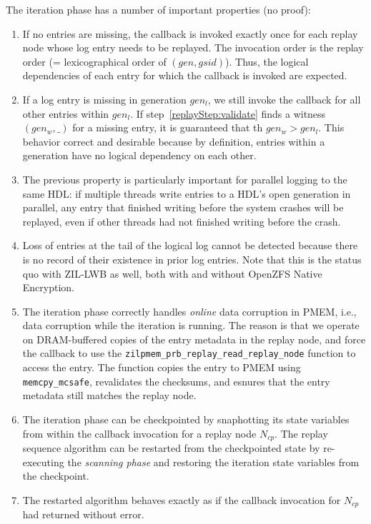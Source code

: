 \documentclass[12pt,a4paper,twoside]{book}
\begin{document}
The iteration phase has a number of important properties (no proof):
\begin{enumerate}[noitemsep]
    \item If no entries are missing, the callback is invoked exactly once for each replay node whose log entry needs to be replayed.
        The invocation order is the replay order (= lexicographical order of $(gen, gsid)$).
        Thus, the logical dependencies of each entry for which the callback is invoked are expected.
    \item If a log entry is missing in generation $gen_l$, we still invoke the callback for all other entries within $gen_l$.
        If step~\ref{replayStep:validate} finds a witness $(gen_w, \_)$ for a missing entry, it is guaranteed that th $gen_w > gen_l$.
        This behavior correct and desirable because by definition, entries within a generation have no logical dependency on each other.
    \item The previous property is particularly important for parallel logging to the same HDL:
        if multiple threads write entries to a HDL's open generation in parallel, any entry that finished writing before the system crashes will be replayed, even if other threads had not finished writing before the crash.
    \item Loss of entries at the tail of the logical log cannot be detected because there is no record of their existence in prior log entries.
        Note that this is the status quo with ZIL-LWB as well, both with and without OpenZFS Native Encryption.
    \item The iteration phase correctly handles \textit{online} data corruption in PMEM, i.e., data corruption while the iteration is running.
        The reason is that we operate on DRAM-buffered copies of the entry metadata in the replay node, and force the callback to use the \lstinline{zilpmem_prb_replay_read_replay_node} function to access the entry.
        The function copies the entry to PMEM using \lstinline{memcpy_mcsafe}, revalidates the checksums, and esnures that the entry metadata still matches the replay node.
    \item The iteration phase can be checkpointed by snaphotting its state variables from within the callback invocation for a replay node $N_{cp}$.
        The replay sequence algorithm can be restarted from the checkpointed state by re-executing the \textit{scanning phase} and restoring the iteration state variables from the checkpoint.
    \item The restarted algorithm behaves exactly as if the callback invocation for $N_{cp}$ had returned without error.

\end{enumerate}
\end{document}
